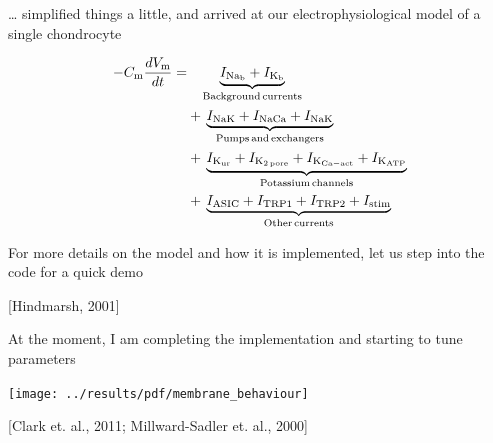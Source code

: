 \documentclass{beamer}
\newcommand{\references}[1] {
  \begin{flushright}
    \scriptsize [#1] \normalsize
  \end{flushright}
}
\begin{document}
\begin{frame}{\ldots{} simplified things a little, and arrived at our
    electrophysiological model of a single chondrocyte}

  \begin{equation*}
    \begin{split}
      -C_{\rm m} \frac{dV_{\rm m}}{dt} = & \phantom{+\,} \underbrace{I_{\rm Na_b} + I_{\rm K_b}}_{\rm Background\, currents}\\
      & +\, \underbrace{I_{\rm NaK} + I_{\rm NaCa} + I_{\rm NaK}}_{\rm Pumps\, and\, exchangers}\\
      & +\, \underbrace{I_{\rm K_{ur}} + I_{\rm K_{2\, pore}} + I_{\rm K_{Ca-act}} + I_{\rm K_{ATP}}}_{\rm Potassium\, channels}\\
      & +\, \underbrace{I_{\rm ASIC} + I_{\rm TRP1} + I_{\rm TRP2} + I_{\rm stim}}_{\rm Other\, currents}
    \end{split}
  \end{equation*}

  \vspace{0.5cm}
  \pause
  For more details on the model and how it is implemented, let us step
  into the code for a quick demo

  \references{Hindmarsh, 2001}

\end{frame}



%

\begin{frame}{At the moment, I am completing the implementation and
    starting to tune parameters}

  \vspace{-0.4cm}

  \begin{center}
    \texttt{[image: ../results/pdf/membrane\_behaviour]}
  \end{center}

  \references{Clark et. al., 2011; Millward-Sadler et. al., 2000}

\end{frame}
\end{document}
